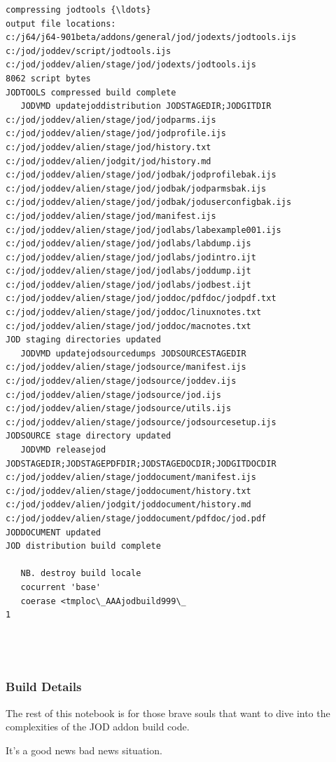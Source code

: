 \documentclass[11pt,letter,landscape]{article}
\begin{document}
\begin{Verbatim}[commandchars=\\\{\}]
compressing jodtools {\ldots}
output file locations:
c:/j64/j64-901beta/addons/general/jod/jodexts/jodtools.ijs
c:/jod/joddev/script/jodtools.ijs
c:/jod/joddev/alien/stage/jod/jodexts/jodtools.ijs
8062 script bytes
JODTOOLS compressed build complete
   JODVMD updatejoddistribution JODSTAGEDIR;JODGITDIR
c:/jod/joddev/alien/stage/jod/jodparms.ijs
c:/jod/joddev/alien/stage/jod/jodprofile.ijs
c:/jod/joddev/alien/stage/jod/history.txt
c:/jod/joddev/alien/jodgit/jod/history.md
c:/jod/joddev/alien/stage/jod/jodbak/jodprofilebak.ijs
c:/jod/joddev/alien/stage/jod/jodbak/jodparmsbak.ijs
c:/jod/joddev/alien/stage/jod/jodbak/joduserconfigbak.ijs
c:/jod/joddev/alien/stage/jod/manifest.ijs
c:/jod/joddev/alien/stage/jod/jodlabs/labexample001.ijs
c:/jod/joddev/alien/stage/jod/jodlabs/labdump.ijs
c:/jod/joddev/alien/stage/jod/jodlabs/jodintro.ijt
c:/jod/joddev/alien/stage/jod/jodlabs/joddump.ijt
c:/jod/joddev/alien/stage/jod/jodlabs/jodbest.ijt
c:/jod/joddev/alien/stage/jod/joddoc/pdfdoc/jodpdf.txt
c:/jod/joddev/alien/stage/jod/joddoc/linuxnotes.txt
c:/jod/joddev/alien/stage/jod/joddoc/macnotes.txt
JOD staging directories updated
   JODVMD updatejodsourcedumps JODSOURCESTAGEDIR
c:/jod/joddev/alien/stage/jodsource/manifest.ijs
c:/jod/joddev/alien/stage/jodsource/joddev.ijs
c:/jod/joddev/alien/stage/jodsource/jod.ijs
c:/jod/joddev/alien/stage/jodsource/utils.ijs
c:/jod/joddev/alien/stage/jodsource/jodsourcesetup.ijs
JODSOURCE stage directory updated
   JODVMD releasejod JODSTAGEDIR;JODSTAGEPDFDIR;JODSTAGEDOCDIR;JODGITDOCDIR
c:/jod/joddev/alien/stage/joddocument/manifest.ijs
c:/jod/joddev/alien/stage/joddocument/history.txt
c:/jod/joddev/alien/jodgit/joddocument/history.md
c:/jod/joddev/alien/stage/joddocument/pdfdoc/jod.pdf
JODDOCUMENT updated
JOD distribution build complete
   
   NB. destroy build locale
   cocurrent 'base'
   coerase <tmploc\_AAAjodbuild999\_
1
   
   
   

    \end{Verbatim}

    \subsubsection{Build Details}\label{build-details}

The rest of this notebook is for those brave souls that want to dive
into the complexities of the JOD addon build code.

It's a good news bad news situation.
\end{document}
